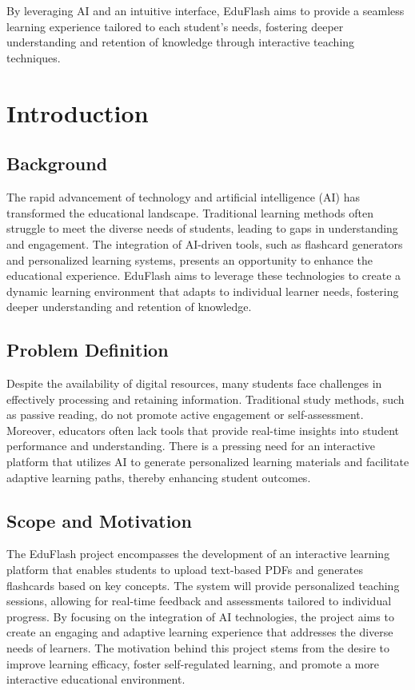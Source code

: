 \documentclass{report}
\begin{document}
\\
\\
By leveraging AI and an intuitive interface, EduFlash aims to provide a seamless learning experience tailored to each student’s needs, fostering deeper understanding and retention of knowledge through interactive teaching techniques.



\tableofcontents{}
\newpage
\listoffigures

\newpage
\pagestyle{fancy}
\fancyhf{}
\chapter{Introduction}

\section{Background}
The rapid advancement of technology and artificial intelligence (AI) has transformed the educational landscape. Traditional learning methods often struggle to meet the diverse needs of students, leading to gaps in understanding and engagement. The integration of AI-driven tools, such as flashcard generators and personalized learning systems, presents an opportunity to enhance the educational experience. EduFlash aims to leverage these technologies to create a dynamic learning environment that adapts to individual learner needs, fostering deeper understanding and retention of knowledge.

\section{Problem Definition}
Despite the availability of digital resources, many students face challenges in effectively processing and retaining information. Traditional study methods, such as passive reading, do not promote active engagement or self-assessment. Moreover, educators often lack tools that provide real-time insights into student performance and understanding. There is a pressing need for an interactive platform that utilizes AI to generate personalized learning materials and facilitate adaptive learning paths, thereby enhancing student outcomes.

\section{Scope and Motivation}
The EduFlash project encompasses the development of an interactive learning platform that enables students to upload text-based PDFs and generates flashcards based on key concepts. The system will provide personalized teaching sessions, allowing for real-time feedback and assessments tailored to individual progress. By focusing on the integration of AI technologies, the project aims to create an engaging and adaptive learning experience that addresses the diverse needs of learners. The motivation behind this project stems from the desire to improve learning efficacy, foster self-regulated learning, and promote a more interactive educational environment.
\end{document}
